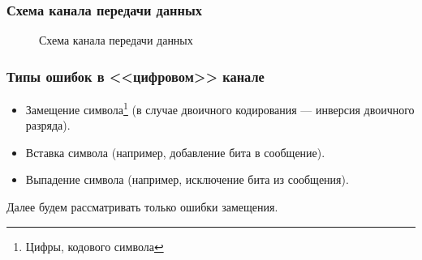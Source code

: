 \begin{frame}
    \frametitle{Схема канала передачи данных}
    
    \begin{figure}
        \begin{center}
            \caption{Схема канала передачи данных}\label{pict:channel}
        \end{center}
    \end{figure} 
\end{frame}


\begin{frame}
    \frametitle{Типы ошибок в <<цифровом>> канале}
    
    \begin{itemize}
        \item \alert{Замещение} символа\footnote{Цифры, кодового символа} (в случае двоичного кодирования --- инверсия двоичного разряда).
        
        \item Вставка символа (например, добавление бита в сообщение).
        
        \item Выпадение символа (например, исключение бита из сообщения).
    \end{itemize} 
    Далее будем рассматривать только ошибки \alert{замещения}.
\end{frame}


